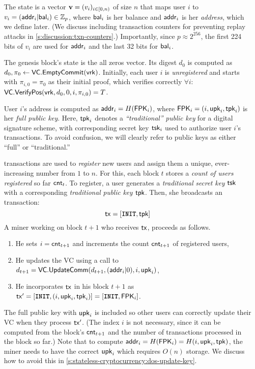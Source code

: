 The state is a vector $\bm{\mathrm{v}}=(v_i)_{i\in[0,n)}$ of size $n$ that maps user $i$ to $v_i=(\mathsf{addr}_i|\mathsf{bal}_i)\in \mathbb{Z}_p$, where $\mathsf{bal}_i$ is her balance and $\mathsf{addr}_i$ is her \textit{address}, which we define later.
(We discuss including transaction counters for preventing replay attacks in \cref{s:discussion:txn-counters}.)
Importantly, since $p \approx 2^{256}$, the first 224 bits of $v_i$ are used for $\mathsf{addr}_i$ and the last 32 bits for $\mathsf{bal}_i$.

The genesis block's state is the all zeros vector.
Its digest $d_0$ is computed as $d_0, \pi_0 \leftarrow \mathsf{VC}.\mathsf{EmptyCommit}(\mathsf{vrk})$.
Initially, each user $i$ is \textit{unregistered} and starts with $\pi_{i,0}=\pi_0$ as their initial proof, which verifies correctly $\forall i$: $\mathsf{VC}.\mathsf{VerifyPos}(\mathsf{vrk}, d_0, 0, i,\pi_{i,0})=T$.

User $i$'s address is computed as $\mathsf{addr}_i=H(\mathbf{\mathsf{FPK}}_i)$, where $\mathbf{\mathsf{FPK}}_i=(i,\mathsf{upk}_i,\mathsf{tpk}_i)$ is her \textit{full public key}.
Here, $\mathsf{tpk}_i$ denotes a \textit{``traditional'' public key} for a digital signature scheme, with corresponding secret key $\mathsf{tsk}_i$ used to authorize user $i$'s transactions.
To avoid confusion, we will clearly refer to public keys as either ``full'' or ``traditional.''

\inittxn transactions are used to \textit{register} new users and assign them a unique, ever-increasing number from $1$ to $n$.
For this, each block $t$ stores a \textit{count of users registered} so far $\mathsf{cnt}_t$.
To register, a user generates a \textit{traditional secret key} $\mathsf{tsk}$ with a corresponding \textit{traditional public key} $\mathsf{tpk}$.
Then, she broadcasts an \inittxn transaction:
$$\mathsf{tx}=[\texttt{\textbf{INIT}}, \mathsf{tpk}]$$
A miner working on block ${t+1}$ who receives $\mathsf{tx}$, proceeds as follows.
\begin{enumerate}
\item He sets $i=\mathsf{cnt}_{t+1}$ and increments the count $\mathsf{cnt}_{t+1}$ of registered users,
\item He updates the VC using a call to $d_{t+1}=\mathsf{VC}.\mathsf{UpdateComm}(d_{t+1}, (\mathsf{addr}_i\vert 0), i, \mathsf{upk}_i)$,
\item He incorporates $\mathsf{tx}$ in his block $t+1$ as $\mathsf{tx}' = [\texttt{\textbf{INIT}}, (i, \mathsf{upk}_i,\mathsf{tpk}_i)]=[\texttt{\textbf{INIT}}, \mathbf{\mathsf{FPK}}_i]$.
\end{enumerate}

The full public key with $\mathsf{upk}_i$ is included so other users can correctly update their VC when they process $\mathsf{tx}'$.
(The index $i$ is not necessary, since it can be computed from the block's $\mathsf{cnt}_{t+1}$ and the number of \inittxn transactions processed in the block so far.)
Note that to compute $\mathsf{addr}_i=H(\mathbf{\mathsf{FPK}}_i)=H(i,\mathsf{upk}_i,\mathsf{tpk})$, the miner needs to have the correct $\mathsf{upk}_i$ which requires $O(n)$ storage.
We discuss how to avoid this in \cref{s:stateless-cryptocurrency:dos-update-key}.

